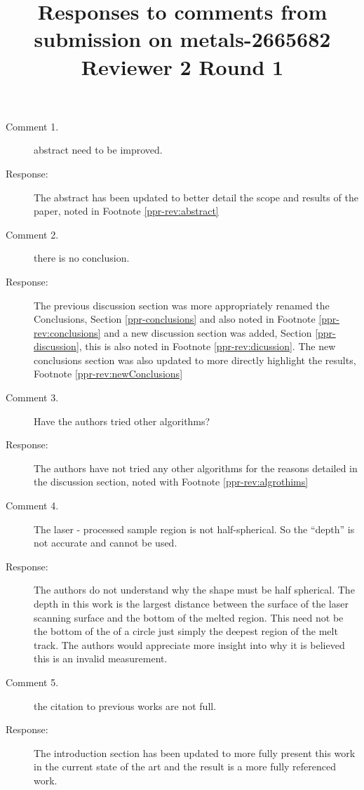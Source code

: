 \documentclass{article}
\begin{document}
\title{Responses to comments from submission on metals-2665682\\Reviewer 2 Round 1}
\date{}

\maketitle

\begin{description}
	\item[Comment 1.] abstract need to be improved.
 	\item[Response:] The abstract has been updated to better detail the scope and results of the paper, noted in Footnote \ref{ppr-rev:abstract}
	\item[Comment 2.] there is no conclusion.
 	\item[Response:] The previous discussion section was more appropriately renamed the Conclusions, Section \ref{ppr-conclusions} and also noted in Footnote \ref{ppr-rev:conclusions} and a new discussion section was added, Section \ref{ppr-discussion}, this is also noted in Footnote \ref{ppr-rev:dicussion}.  The new conclusions section was also updated to more directly highlight the results, Footnote \ref{ppr-rev:newConclusions}
	\item[Comment 3.] Have the authors tried other algorithms?
	\item[Response:] The authors have not tried any other algorithms for the reasons detailed in the discussion section, noted with Footnote \ref{ppr-rev:algrothims}
	\item[Comment 4.] The laser - processed sample region is not half-spherical. So the ``depth'' is not accurate and cannot be used.
	\item[Response:] The authors do not understand why the shape must be half spherical.  The depth in this work is the largest distance between the surface of the laser scanning surface and the bottom of the melted region.  This need not be the bottom of the of a circle just simply the deepest region of the melt track.  The authors would appreciate more insight into why it is believed this is an invalid measurement.
	\item[Comment 5.] the citation to previous works are not full.
	\item[Response:] The introduction section has been updated to more fully present this work in the current state of the art and the result is a more fully referenced work.
\end{description}
\end{document}
